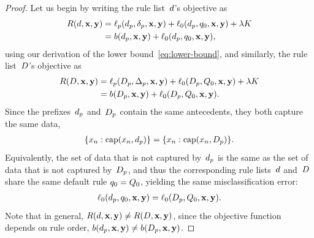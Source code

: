 \begin{proof}
Let us begin by writing the rule list~${d}$'s objective as
\begin{align}
\Obj(\RL, \x, \y) &= \Loss_p(\Prefix, \Labels, \x, \y)
  + \Loss_0(\Prefix, \Default, \x, \y) + \Reg K \\
&= b(\Prefix, \x, \y) + \Loss_0(\Prefix, \Default, \x, \y),
\end{align}
using our derivation of the lower bound~\eqref{eq:lower-bound},
and similarly, the rule list~${D}$'s objective as
\begin{align}
\Obj(\RLB, \x, \y) &= \Loss_p(\PrefixB, \LabelsB, \x, \y)
  + \Loss_0(\PrefixB, \DefaultB, \x, \y) + \Reg K \\
&= b(\PrefixB, \x, \y) + \Loss_0(\PrefixB, \DefaultB, \x, \y).
\end{align}
Since the prefixes~$d_p$ and~$D_p$ contain
the same antecedents, they both capture the same data,
\begin{align}
\{x_n : \Cap(x_n, \Prefix)\} = \{x_n : \Cap(x_n, \PrefixB)\}.
\end{align}
Equivalently, the set of data that is not captured by~$d_p$
is the same as the set of data that is not captured by~$D_p$,
and thus the corresponding rule lists~${d}$ and~${D}$
share the same default rule ${q_0 = Q_0}$,
yielding the same misclassification error:
\begin{align}
\Loss_0(\Prefix, \Default, \x, \y) = \Loss_0(\PrefixB, \DefaultB, \x, \y).
\label{eq:same-default}
\end{align}
Note that in general, ${R({d}, \mathbf{x}, \mathbf{y}) \neq R({D}, \mathbf{x}, \mathbf{y})}$,
since the objective function depends on rule order,
\ie ${b(d_p, \mathbf{x}, \mathbf{y}) \neq b(D_p, \mathbf{x}, \mathbf{y})}$.


\end{proof}
